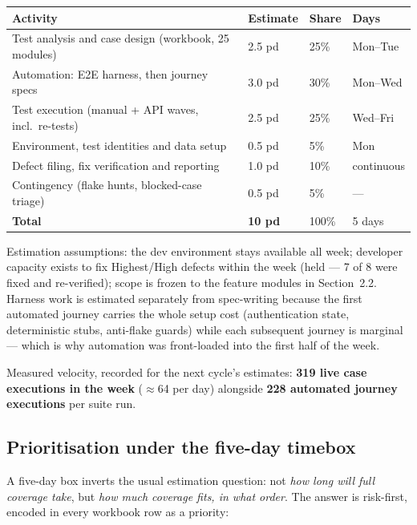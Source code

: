 \documentclass[11pt,a4paper]{article}
\begin{document}
\begin{center}
\small
\begin{tabularx}{\textwidth}{Llll}
\toprule
\textbf{Activity} & \textbf{Estimate} & \textbf{Share} & \textbf{Days} \\
\midrule
Test analysis and case design (workbook, 25 modules) & 2.5 pd & 25\% & Mon--Tue \\
Automation: E2E harness, then journey specs & 3.0 pd & 30\% & Mon--Wed \\
Test execution (manual + API waves, incl.\ re-tests) & 2.5 pd & 25\% & Wed--Fri \\
Environment, test identities and data setup & 0.5 pd & 5\% & Mon \\
Defect filing, fix verification and reporting & 1.0 pd & 10\% & continuous \\
Contingency (flake hunts, blocked-case triage) & 0.5 pd & 5\% & --- \\
\midrule
\textbf{Total} & \textbf{10 pd} & 100\% & 5 days \\
\bottomrule
\end{tabularx}
\end{center}

Estimation assumptions: the dev environment stays available all week; developer
capacity exists to fix Highest/High defects within the week (held --- 7 of 8
were fixed and re-verified); scope is frozen to the feature modules in
Section~2.2. Harness work is estimated separately from spec-writing because the
first automated journey carries the whole setup cost (authentication state,
deterministic stubs, anti-flake guards) while each subsequent journey is
marginal --- which is why automation was front-loaded into the first half of
the week.

Measured velocity, recorded for the next cycle's estimates: \textbf{319 live
case executions in the week} ($\approx$64 per day) alongside \textbf{228
automated journey executions} per suite run.

\subsection{Prioritisation under the five-day timebox}
A five-day box inverts the usual estimation question: not \emph{how long will
full coverage take}, but \emph{how much coverage fits, in what order}. The
answer is risk-first, encoded in every workbook row as a priority:
\end{document}
